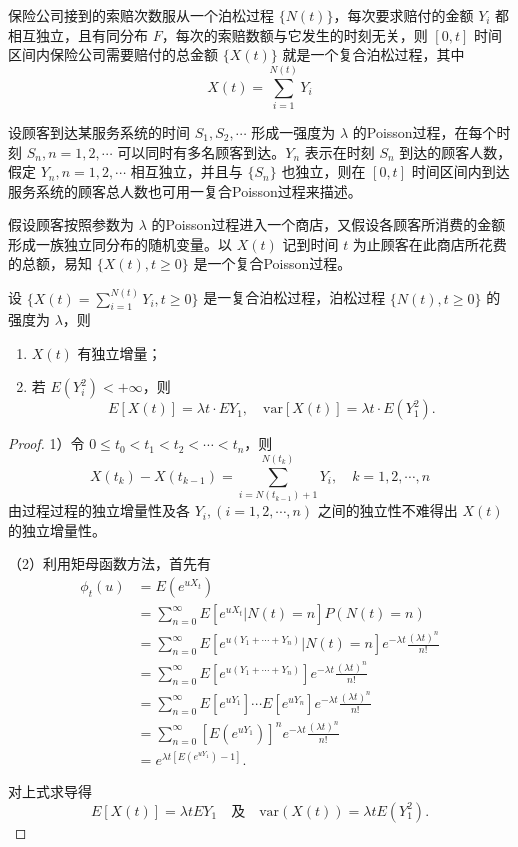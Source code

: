 \documentclass[lang=cn,10pt,thmcnt=section]{elegantbook}
\begin{document}
\begin{example}
	保险公司接到的索赔次数服从一个泊松过程 $\{N(t)\}$，每次要求赔付的金额 $Y_i$ 都相互独立，且有同分布 $F$，每次的索赔数额与它发生的时刻无关，则 $[0,t]$ 时间区间内保险公司需要赔付的总金额 $\{X(t)\}$ 就是一个复合泊松过程，其中
\[
X(t) = \sum_{i=1}^{N(t)} Y_i
\]
\end{example}
\begin{example}
	设顾客到达某服务系统的时间 $S_1, S_2, \cdots$ 形成一强度为 $\lambda$ 的Poisson过程，在每个时刻 $S_n, n = 1, 2, \cdots$ 可以同时有多名顾客到达。$Y_n$ 表示在时刻 $S_n$ 到达的顾客人数，假定 $Y_n, n = 1, 2, \cdots$ 相互独立，并且与 $\{S_n\}$ 也独立，则在 $[0,t]$ 时间区间内到达服务系统的顾客总人数也可用一复合Poisson过程来描述。
\end{example}
\begin{example}
	假设顾客按照参数为 $\lambda$ 的Poisson过程进入一个商店，又假设各顾客所消费的金额形成一族独立同分布的随机变量。以 $X(t)$ 记到时间 $t$ 为止顾客在此商店所花费的总额，易知 $\{X(t), t \geq 0\}$ 是一个复合Poisson过程。
\end{example}
\begin{theorem}\label{th:3.3.2}
	设 $\{X(t) = \sum_{i=1}^{N(t)} Y_i, t \geq 0\}$ 是一复合泊松过程，泊松过程 $\{N(t), t \geq 0\}$ 的强度为 $\lambda$，则
	\begin{enumerate}
		\item $X(t)$ 有独立增量；
		\item 若 $E(Y_i^2) < +\infty$，则
		\[
		E[X(t)] = \lambda t \cdot EY_1, \quad \text{var}[X(t)] = \lambda t \cdot E(Y_1^2).
		\]
	\end{enumerate}
\end{theorem}
\begin{proof}
	1）令 $0 \leq t_0 < t_1 < t_2 < \cdots < t_n$，则
\[
X(t_k) - X(t_{k-1}) = \sum_{i=N(t_{k-1})+1}^{N(t_k)} Y_i, \quad k = 1, 2, \cdots, n
\]
由过程过程的独立增量性及各 $Y_i, (i = 1, 2, \cdots, n)$ 之间的独立性不难得出 $X(t)$ 的独立增量性。

（2）利用矩母函数方法，首先有
\[
\begin{aligned}
\phi_t(u) &= E(e^{uX_t}) \\
&= \sum_{n=0}^{\infty} E[e^{uX_t} | N(t) = n] P(N(t) = n) \\
&= \sum_{n=0}^{\infty} E[e^{u(Y_1 + \cdots + Y_n)} | N(t) = n] e^{-\lambda t} \frac{(\lambda t)^n}{n!} \\
&= \sum_{n=0}^{\infty} E[e^{u(Y_1 + \cdots + Y_n)}] e^{-\lambda t} \frac{(\lambda t)^n}{n!} \\
&= \sum_{n=0}^{\infty} E[e^{uY_1}] \cdots E[e^{uY_n}] e^{-\lambda t} \frac{(\lambda t)^n}{n!} \\
&= \sum_{n=0}^{\infty} [E(e^{uY_1})]^n e^{-\lambda t} \frac{(\lambda t)^n}{n!} \\
&= e^{\lambda t [E(e^{uY_1}) - 1]}.
\end{aligned}
\]

对上式求导得
\[
E[X(t)] = \lambda t EY_1 \quad \text{及} \quad \text{var}(X(t)) = \lambda t E(Y_1^2).
\]
\end{proof}
\end{document}

